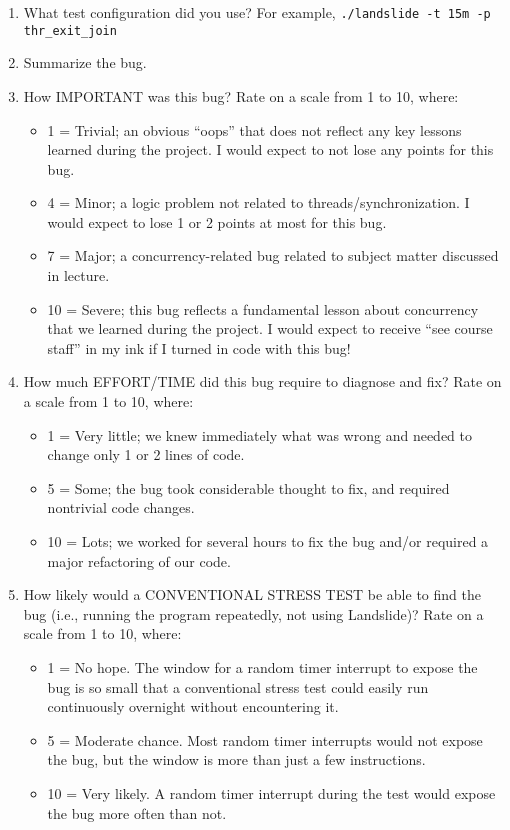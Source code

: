 \documentclass{article}
\begin{document}
\begin{enumerate}
	\item What test configuration did you use? For example, {\tt ./landslide -t 15m -p thr\_exit\_join}
		\vspace{0.5in}
	\item Summarize the bug.
		\vspace{2in}
	\item How IMPORTANT was this bug? Rate on a scale from 1 to 10, where:
		\begin{itemize}
			\item 1 = Trivial; an obvious ``oops'' that does not reflect any key lessons learned during the project. I would expect to not lose any points for this bug.
			\item 4 = Minor; a logic problem not related to threads/synchronization. I would expect to lose 1 or 2 points at most for this bug.
			\item 7 = Major; a concurrency-related bug related to subject matter discussed in lecture.
			\item 10 = Severe; this bug reflects a fundamental lesson about concurrency that we learned during the project. I would expect to receive ``see course staff'' in my ink if I turned in code with this bug!
		\end{itemize}
		\vspace{0.2in}
	\item How much EFFORT/TIME did this bug require to diagnose and fix? Rate on a scale from 1 to 10, where:
		\begin{itemize}
			\item 1 = Very little; we knew immediately what was wrong and needed to change only 1 or 2 lines of code.
			\item 5 = Some; the bug took considerable thought to fix, and required nontrivial code changes.
			\item 10 = Lots; we worked for several hours to fix the bug and/or required a major refactoring of our code.
		\end{itemize}
		\vspace{0.2in}
	\item How likely would a CONVENTIONAL STRESS TEST be able to find the bug (i.e., running the program repeatedly, not using Landslide)? Rate on a scale from 1 to 10, where:
		\begin{itemize}
			\item 1 = No hope. The window for a random timer interrupt to expose the bug is so small that a conventional stress test could easily run continuously overnight without encountering it.
			\item 5 = Moderate chance. Most random timer interrupts would not expose the bug, but the window is more than just a few instructions.
			\item 10 = Very likely. A random timer interrupt during the test would expose the bug more often than not.
		\end{itemize}
\end{enumerate}
\end{document}
